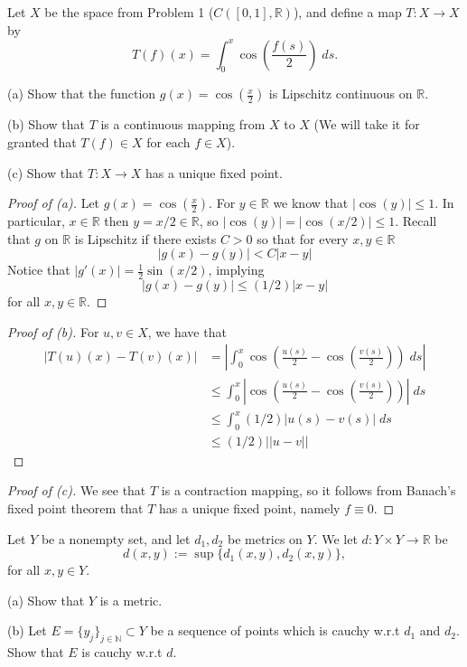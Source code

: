 \begin{prob}
    Let $X$ be the space from Problem 1 ($C([0,1],\mathbb R)$), and 
    define a map $T : X \to X$ by 
    \[
        T(f)(x) = \displaystyle\int_{0}^{x}\cos\left(\frac{f(s)}{2}
        \right)\;ds.
    \]

    (a) Show that the function $g(x) = \cos(\frac{x}{2})$ is 
    Lipschitz continuous on $\mathbb R$. 

    (b) Show that $T$ is a continuous mapping from $X$ to $X$ 
    (We will take it for granted that $T(f) \in X$ for each 
    $f \in X$). 

    (c) Show that $T : X \to X$ has a unique fixed point.
\end{prob}
\begin{proof}[Proof of (a)]
    Let $g(x) = \cos(\frac{x}{2})$. For $y \in \mathbb R$ we 
    know that $|\cos(y)| \leq 1$. In particular, $x \in \mathbb R$ 
    then $y = x/2 \in \mathbb R$, so
    $|\cos(y)| = |\cos(x/2)| \leq 1$. Recall that $g$ on 
    $\mathbb R$ is Lipschitz 
    if there exists $C > 0$ so that for every $x,y \in \mathbb R$
    \[
        |g(x)-g(y)| < C|x-y|
    \]
    Notice that $|g'(x)| = \frac{1}{2}\sin(x/2)$, implying 
    \[
        |g(x)-g(y)| \leq (1/2)|x-y|
    \]
    for all $x,y \in \mathbb R$.
\end{proof}
\begin{proof}[Proof of (b)]
    For $u,v \in X$, we have that 
    \begin{align*}
        |T(u)(x) - T(v)(x)| 
        &= \left|\displaystyle\int_{0}^{x}
        \cos\left(\frac{u(s)}{2}-\cos\left(\frac{v(s)}{2}\right)
        \right) \; ds\right| \\
        &\leq \displaystyle\int_{0}^{x}\left|
        \cos\left(\frac{u(s)}{2}-\cos\left(\frac{v(s)}{2}\right)
        \right)\right|\;ds \\ 
        &\leq \displaystyle\int_{0}^{x}(1/2)|u(s)-v(s)|\;ds \\ 
        &\leq (1/2)||u-v|| 
    \end{align*}
\end{proof}
\begin{proof}[Proof of (c)]
    We see that $T$ is a contraction mapping, so it follows from 
    Banach's fixed point theorem that $T$ has a unique fixed point, 
    namely $f \equiv 0$.
\end{proof}
\begin{prob}
    Let $Y$ be a nonempty set, and let $d_1,d_2$ be metrics on 
    $Y$. We let $d: Y\times Y \to \mathbb R$ be 
    \[
        d(x,y) := \sup\{d_1(x,y),d_2(x,y)\},
    \]
    for all $x,y \in Y$. 

    (a) Show that $Y$ is a metric. 

    (b) Let $E = \{y_j\}_{j\in\mathbb N} \subset Y$ be a sequence 
    of points which is cauchy w.r.t $d_1$ and $d_2$. Show that 
    $E$ is cauchy w.r.t $d$.
\end{prob}

